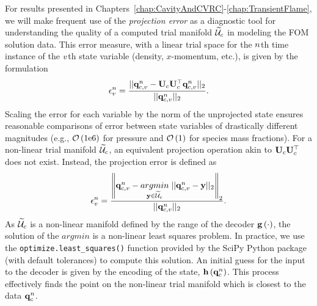 For results presented in Chapters~\ref{chap:CavityAndCVRC}-\ref{chap:TransientFlame}, we will make frequent use of the \textit{projection error} as a diagnostic tool for understanding the quality of a computed trial manifold $\consTrialSpace$ in modeling the FOM solution data. This error measure, with a linear trial space for the $n$th time instance of the $v$th state variable (density, $x$-momentum, etc.), is given by the formulation
%
\begin{equation}
    \errVecVar^\timeIdx = \frac{|| \consVecVar^\timeIdx - \consTrial \consTrial^\top \consVecVar^\timeIdx ||_2}{|| \consVecVar^\timeIdx ||_2}.
\end{equation}
%
Scaling the error for each variable by the norm of the unprojected state ensures reasonable comparisons of error between state variables of drastically different magnitudes (e.g., $\mathcal{O}\left(1\text{e}6\right)$ for pressure and $\mathcal{O}\left(1\right)$ for species mass fractions). For a non-linear trial manifold $\consTrialSpace$, an equivalent projection operation akin to $\consTrial \consTrial^\top$ does not exist. Instead, the projection error is defined as
%
\begin{equation}
    \errVecVar^\timeIdx = \frac{\left\Vert \consVecVar^\timeIdx - \argmin{\dummyVec \in \consTrialSpace} ||\consVecVar^\timeIdx - \dummyVec||_2 \right\Vert_2}{|| \consVecVar^\timeIdx ||_2}.
\end{equation}
%
As $\consTrialSpace$ is a non-linear manifold defined by the range of the decoder $\mathbf{g} \left(\cdot\right)$, the solution of the $argmin$ is a non-linear least squares problem. In practice, we use the \verb|optimize.least_squares()| function provided by the SciPy Python package (with default tolerances) to compute this solution. An initial guess for the input to the decoder is given by the encoding of the state, $\mathbf{h} \left(\mathbf{q}_{c}^{n}\right)$. This process effectively finds the point on the non-linear trial manifold which is closest to the data $\mathbf{q}_{c}^{n}$.

